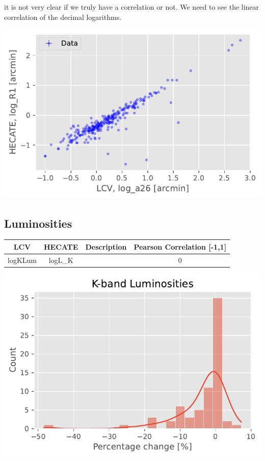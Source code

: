 \documentclass[
]{article}
\begin{document}
it is not very clear if we truly have a correlation or not. We need to
see the linear correlation of the decimal logarithms.

\includegraphics{compare_files/figure-pdf/cell-33-output-1.pdf}

\subsection{Luminosities}\label{luminosities}

\begin{longtable}[]{@{}cccc@{}}
\toprule\noalign{}
LCV & HECATE & Description & Pearson Correlation {[}-1,1{]} \\
\midrule\noalign{}
\endhead
\bottomrule\noalign{}
\endlastfoot
logKLum & logL\_K & & 0 \\
\end{longtable}

\includegraphics{compare_files/figure-pdf/cell-35-output-1.pdf}
\end{document}
